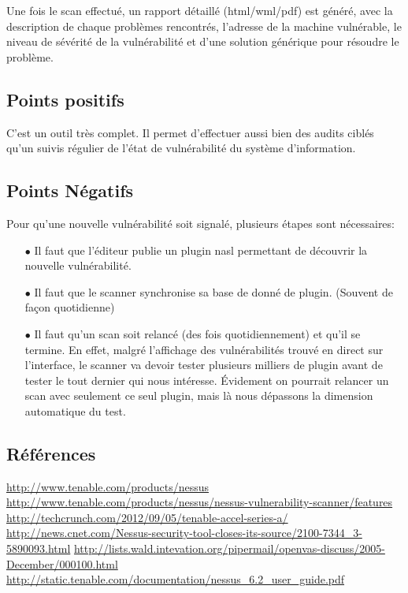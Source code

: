 Une fois le scan effectué, un rapport détaillé (html/wml/pdf) est généré, avec la description de chaque problèmes rencontrés, l’adresse de la machine vulnérable, le niveau de sévérité de la vulnérabilité et d’une solution générique pour résoudre le problème.


\subsection{Points positifs}
C’est un outil très complet. Il permet d'effectuer aussi bien des audits ciblés qu’un suivis régulier de l’état de vulnérabilité du système d’information.

\subsection{Points Négatifs}
Pour qu’une nouvelle vulnérabilité soit signalé, plusieurs étapes sont nécessaires:\\
\begin{itemize}
\item [$\bullet$]Il faut que l’éditeur publie un plugin nasl permettant de découvrir la nouvelle vulnérabilité.\\
\item [$\bullet$]Il faut que le scanner synchronise sa base de donné de plugin. (Souvent de façon quotidienne)\\
\item [$\bullet$]Il faut qu’un scan soit relancé (des fois quotidiennement) et qu’il se termine. En effet, malgré l’affichage des vulnérabilités trouvé en direct sur l’interface, le scanner va devoir tester plusieurs milliers de plugin avant de tester le tout dernier qui nous intéresse. Évidement on pourrait relancer un scan avec seulement ce seul plugin, mais là nous dépassons la dimension automatique du test.
\end{itemize}

\subsection{Références}
\small
\noindent
 [1] \url{http://www.tenable.com/products/nessus} \newline
 [2] \url{http://www.tenable.com/products/nessus/nessus-vulnerability-scanner/features} \newline
 [3] \url{http://techcrunch.com/2012/09/05/tenable-accel-series-a/} \newline
 [3] \url{http://news.cnet.com/Nessus-security-tool-closes-its-source/2100-7344_3-5890093.html} \newline
 [5] \url{http://lists.wald.intevation.org/pipermail/openvas-discuss/2005-December/000100.html} \newline
 [6] \url{http://static.tenable.com/documentation/nessus_6.2_user_guide.pdf} \newline
\normalsize